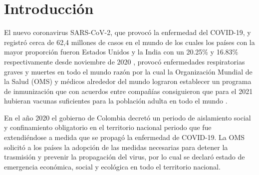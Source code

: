 \documentclass[12pt]{article}
\begin{document}
\tableofcontents
{}








\newpage

\listoffigures

\newpage




\newpage


\section{Introducción}


El nuevo coronavirus SARS-CoV-2, que provocó la enfermedad del COVID-19, y registró cerca de 62,4 millones de casos en el mundo de los cuales los pa\'ises con la mayor proporci\'on fueron Estados Unidos y la  India con un 20.25\% y 16.83\% respectivamente desde noviembre de 2020 \cite{6}, provocó enfermedades respiratorias graves y muertes en todo el mundo \cite{7} razón por la cual la Organización Mundial de la Salud (OMS) y médicos alrededor del mundo lograron establecer un programa de inmunización que con acuerdos entre compañías consiguieron que para el 2021 hubieran vacunas suficientes para la población adulta en todo el mundo \cite{30}. 

En el año 2020 el gobierno de Colombia decretó un periodo de aislamiento social y confinamiento obligatorio en el territorio nacional periodo que fue extendiéndose a medida que se propagó la enfermedad de COVID-19. La OMS solicitó a los países la adopción de las medidas necesarias para detener la trasmisión y prevenir la propagación del virus, por lo cual se declaró estado de emergencia económica, social y ecológica en todo el territorio nacional.
\end{document}
